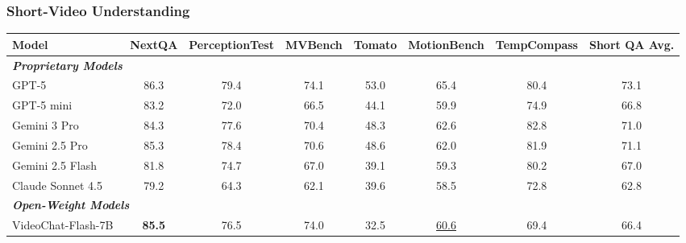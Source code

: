 \documentclass[11pt, letterpaper]{template}
\theoremstyle{plain}
\theoremstyle{definition}
\theoremstyle{remark}
\begin{document}
\subsubsection{Short-Video Understanding}

\begin{table}[t]
    \centering
\begin{adjustbox}{width=\linewidth,center}
\renewcommand{\arraystretch}{1.1}
\setlength{\tabcolsep}{1.5mm}
\begin{tabular}{lccccccc}
\toprule
\textbf{Model} & \textbf{NextQA} & \textbf{PerceptionTest} & \textbf{MVBench} & \textbf{Tomato} & \textbf{MotionBench} & \textbf{TempCompass} & \textbf{Short QA Avg.} \\
\midrule
\multicolumn{8}{l}{\textbf{\textit{Proprietary Models}}} \\
GPT-5~\citep{gpt5} & 86.3 & 79.4 & 74.1 & 53.0 & 65.4 & 80.4 & 73.1\\
GPT-5 mini~\citep{gpt5} & 83.2 & 72.0 & 66.5 & 44.1 & 59.9 & 74.9 & 66.8\\
Gemini 3 Pro~\citep{gemini3pro} & 84.3 & 77.6 & 70.4 & 48.3 & 62.6 & 82.8 & 71.0\\
Gemini 2.5 Pro~\citep{comanici2025gemini} & 85.3 & 78.4 & 70.6 & 48.6 & 62.0 & 81.9 & 71.1\\
Gemini 2.5 Flash~\citep{comanici2025gemini} & 81.8 & 74.7 & 67.0 & 39.1 & 59.3 & 80.2 & 67.0\\
Claude Sonnet 4.5~\citep{sonnet45} & 79.2 & 64.3 & 62.1 & 39.6 & 58.5 & 72.8 & 62.8\\
\midrule
\multicolumn{8}{l}{\textbf{\textit{Open-Weight Models}}} \\
VideoChat-Flash-7B~\citep{li2024videochat} & \textbf{85.5} & 76.5 & 74.0 & 32.5 & \underline{60.6} & 69.4 & 66.4\\


\end{tabular}
\end{adjustbox}
\end{table}
\end{document}

